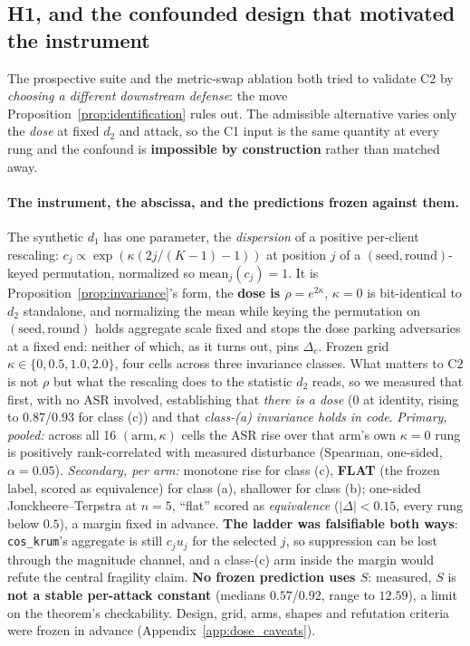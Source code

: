 \documentclass{article}
\begin{document}
\subsection{H1, and the confounded design that motivated the instrument}

The prospective suite and the metric-swap ablation both tried to validate C2 by \emph{choosing a different downstream defense}: the move Proposition~\ref{prop:identification} rules out. The admissible alternative varies only the \emph{dose} at fixed $d_2$ and attack, so the C1 input is the same quantity at every rung and the confound is \textbf{impossible by construction} rather than matched away.

\paragraph{The instrument, the abscissa, and the predictions frozen against them.} The synthetic $d_1$ has one parameter, the \emph{dispersion} of a positive per-client rescaling: $c_j \propto \exp(\kappa(2j/(K{-}1) - 1))$ at position $j$ of a $(\text{seed},\text{round})$-keyed permutation, normalized so $\mathrm{mean}_j(c_j) = 1$. It is Proposition~\ref{prop:invariance}'s form, the \textbf{dose is $\rho = e^{2\kappa}$}, $\kappa{=}0$ is bit-identical to $d_2$ standalone, and normalizing the mean while keying the permutation on $(\text{seed},\text{round})$ holds aggregate scale fixed and stops the dose parking adversaries at a fixed end: neither of which, as it turns out, pins $\Delta_c$. Frozen grid $\kappa \in \{0,0.5,1.0,2.0\}$, four cells across three invariance classes. What matters to C2 is not $\rho$ but what the rescaling does to the statistic $d_2$ reads, so we measured that first, with no ASR involved, establishing that \emph{there is a dose} ($0$ at identity, rising to $0.87$/$0.93$ for class (c)) and that \emph{class-(a) invariance holds in code}. \emph{Primary, pooled:} across all 16 $(\text{arm},\kappa)$ cells the ASR rise over that arm's own $\kappa{=}0$ rung is positively rank-correlated with measured disturbance (Spearman, one-sided, $\alpha{=}0.05$). \emph{Secondary, per arm:} monotone rise for class (c), \textbf{FLAT} (the frozen label, scored as equivalence) for class (a), shallower for class (b); one-sided Jonckheere--Terpstra at $n{=}5$, ``flat'' scored as \emph{equivalence} ($|\Delta| < 0.15$, every rung below $0.5$), a margin fixed in advance. \textbf{The ladder was falsifiable both ways}: \texttt{cos\_krum}'s aggregate is still $c_ju_j$ for the selected $j$, so suppression can be lost through the magnitude channel, and a class-(c) arm inside the margin would refute the central fragility claim. \textbf{No frozen prediction uses $S$}: measured, $S$ is \textbf{not a stable per-attack constant} (medians $0.57$/$0.92$, range to $12.59$), a limit on the theorem's checkability. Design, grid, arms, shapes and refutation criteria were frozen in advance (Appendix~\ref{app:dose_caveats}).
\end{document}
